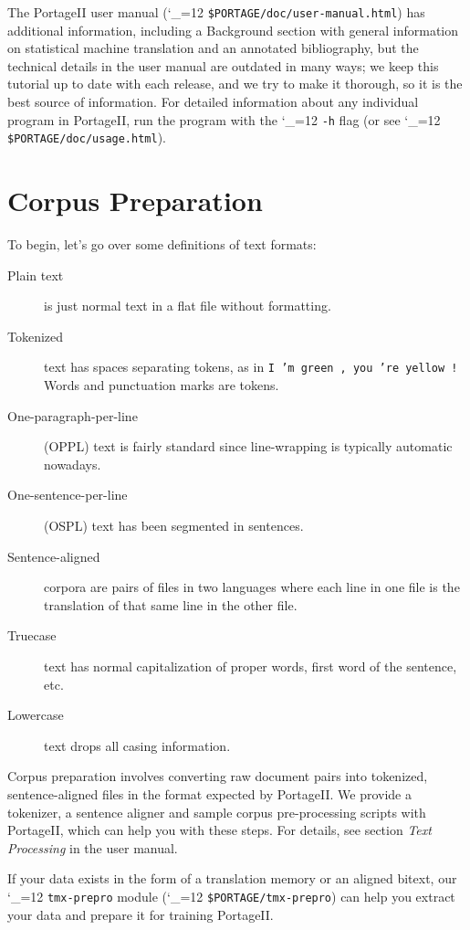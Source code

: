 \documentclass[11pt,letterpaper]{article}
\newcommand{\PS}{PortageII\xspace}
\def\code{\begingroup\catcode`\_=12 \codex}
\newcommand{\codex}[1]{\texttt{#1}\endgroup}
\begin{document}
The \PS user manual (\code{\$PORTAGE/doc/user-manual.html})
has additional information, including a Background section with general
information on statistical machine translation and an annotated bibliography, but the technical details in
the user manual are outdated in many ways; we keep this tutorial up to date
with each release, and we try to make it thorough, so it is the best source of
information.  For detailed information about any individual program in \PS, run
the program with the \code{-h} flag (or see \code{\$PORTAGE/doc/usage.html}).


\section{Corpus Preparation} \label{CorpusPreparation}

To begin, let's go over some definitions of text formats:
\begin{description}
  \item[Plain text] is just normal text in a flat file without formatting.
  \item[Tokenized] text has spaces separating tokens, as in \texttt{I 'm green
  , you 're yellow !} Words and punctuation marks are tokens.
  \item[One-paragraph-per-line] (OPPL) text is fairly standard since line-wrapping is
  typically automatic nowadays.
  \item[One-sentence-per-line] (OSPL) text has been segmented in sentences.
  \item[Sentence-aligned] corpora are pairs of files in two languages where
  each line in one file is the translation of that same line in the other file.
  \item[Truecase] text has normal capitalization of proper words, first word of
  the sentence, etc.
  \item[Lowercase] text drops all casing information.
\end{description}

Corpus preparation involves converting raw document pairs into tokenized,
sentence-aligned files in the format expected by \PS.  We provide a
tokenizer, a sentence aligner and sample corpus pre-processing scripts with
\PS, which can help you with these steps.  For details, see section \emph{Text
Processing} in the user manual.

If your data exists in the form of a translation memory or an aligned bitext,
our \code{tmx-prepro} module (\code{\$PORTAGE/tmx-prepro}) can help you extract
your data and prepare it for training \PS.
\end{document}
